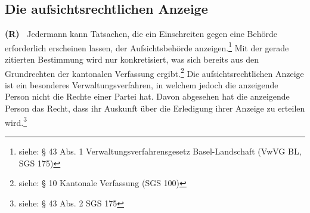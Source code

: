 \documentclass[paper=a4,fontsize=12pt, oneside, numbers=noenddot]{scrbook}
\newcounter{rz}
\newcommand{\Rz}{
	\addtocounter{rz}{1}\textbf{(R\arabic{rz})~}
}
\begin{document}
\subsection{Die aufsichtsrechtlichen Anzeige}\label{section:AufsichtsrechtlicheAnzeige}
\Rz Jedermann kann Tatsachen, die ein Einschreiten gegen eine Behörde erforderlich erscheinen lassen, der Aufsichtsbehörde anzeigen.\footnote{siehe: § 43 Abs. 1 Verwaltungsverfahrensgesetz Basel-Landschaft (VwVG BL, SGS 175)} Mit der gerade zitierten Bestimmung wird nur konkretisiert, was sich bereits aus den Grundrechten der kantonalen Verfassung ergibt.\footnote{siehe: § 10 Kantonale Verfassung (SGS 100)} Die aufsichtsrechtlichen Anzeige ist ein besonderes Verwaltungsverfahren, in welchem jedoch die anzeigende Person nicht die Rechte einer Partei hat. Davon abgesehen hat die anzeigende Person das Recht, dass ihr Auskunft über die Erledigung ihrer Anzeige zu erteilen wird.\footnote{siehe: § 43 Abs. 2 SGS 175} 
\end{document}
